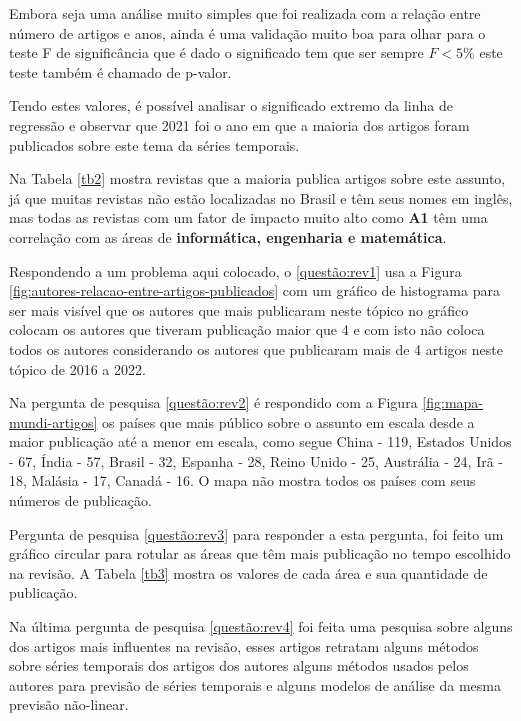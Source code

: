 Embora seja uma análise muito simples que foi realizada com a relação entre número de artigos e anos, ainda é uma validação muito boa para olhar para o teste F de significância que é dado o significado tem que ser sempre $F<5\%$ este teste também é chamado de p-valor.

Tendo estes valores, é possível analisar o significado extremo da linha de regressão e observar que 2021 foi o ano em que a maioria dos artigos foram publicados sobre este tema da séries temporais.



Na Tabela \ref{tb2} mostra revistas que a maioria publica artigos sobre este assunto, já que muitas revistas não estão localizadas no Brasil e têm seus nomes em inglês, mas todas as revistas com um fator de impacto muito alto como \textbf{A1} têm uma correlação com as áreas de \textbf{informática, engenharia e matemática}.





Respondendo a um problema aqui colocado, o \ref{questão:rev1} usa a Figura \ref{fig:autores-relacao-entre-artigos-publicados} com um gráfico de histograma para ser mais visível que os autores que mais publicaram neste tópico no gráfico colocam os autores que tiveram publicação maior que 4 e com isto não coloca todos os autores considerando os autores que publicaram mais de 4 artigos neste tópico de 2016 a 2022.




Na pergunta de pesquisa \ref{questão:rev2} é respondido com a Figura \ref{fig:mapa-mundi-artigos} os países que mais público sobre o assunto em escala desde a maior publicação até a menor em escala, como segue China - 119, Estados Unidos - 67, Índia - 57, Brasil - 32, Espanha - 28, Reino Unido - 25, Austrália - 24, Irã - 18, Malásia - 17, Canadá - 16. O mapa não mostra todos os países com seus números de publicação.




Pergunta de pesquisa \ref{questão:rev3} para responder a esta pergunta, foi feito um gráfico circular para rotular as áreas que têm mais publicação no tempo escolhido na revisão. A Tabela \ref{tb3} mostra os valores de cada área e sua quantidade de publicação. 




Na última pergunta de pesquisa \ref{questão:rev4} foi feita uma pesquisa sobre alguns dos artigos mais influentes na revisão, esses artigos retratam alguns métodos sobre séries temporais dos artigos dos autores 
alguns métodos usados pelos autores para previsão de séries temporais e alguns modelos de análise da mesma previsão não-linear. 



